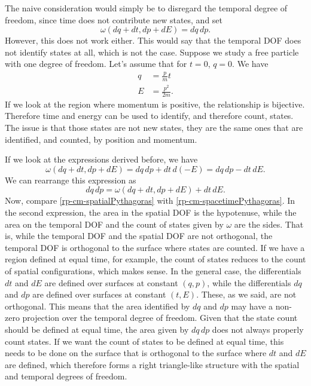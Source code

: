 The naive consideration would simply be to disregard the temporal degree of freedom, since time does not contribute new states, and set
\begin{equation}
	\omega(dq + dt, dp + dE) = dq \, dp.
\end{equation}
However, this does not work either. This would say that the temporal DOF does not identify states at all, which is not the case. Suppose we study a free particle with one degree of freedom. Let's assume that for $t=0$, $q=0$. We have
\begin{equation}
	\begin{aligned}
	q &= \frac{p}{m} t \\
	E &= \frac{p^2}{2m}.
	\end{aligned}
\end{equation}
If we look at the region where momentum is positive, the relationship is bijective. Therefore time and energy can be used to identify, and therefore count, states. The issue is that those states are not new states, they are the same ones that are identified, and counted, by position and momentum.

If we look at the expressions derived before, we have
\begin{equation}
	\omega(dq + dt, dp + dE) = dq \, dp + dt \, d(-E) = dq \, dp - dt \, dE.
\end{equation}
We can rearrange this expression as
\begin{equation}\label{rp-cm-spacetimePythagoras}
	dq \, dp = \omega(dq + dt, dp + dE) + dt \, dE.
\end{equation}
Now, compare \ref{rp-cm-spatialPythagoras} with \ref{rp-cm-spacetimePythagoras}. In the second expression, the area in the spatial DOF is the hypotenuse, while the area on the temporal DOF and the count of states given by $\omega$ are the sides. That is, while the temporal DOF and the spatial DOF are not orthogonal, the temporal DOF is orthogonal to the surface where states are counted. If we have a region defined at equal time, for example, the count of states reduces to the count of spatial configurations, which makes sense. In the general case, the differentials $dt$ and $dE$ are defined over surfaces at constant $(q, p)$, while the differentials $dq$ and $dp$ are defined over surfaces at constant $(t,E)$. These, as we said, are not orthogonal. This means that the area identified by $dq$ and $dp$ may have a non-zero projection over the temporal degree of freedom. Given that the state count should be defined at equal time, the area given by $dq \, dp$ does not always properly count states. If we want the count of states to be defined at equal time, this needs to be done on the surface that is orthogonal to the surface where $dt$ and $dE$ are defined, which therefore forms a right triangle-like structure with the spatial and temporal degrees of freedom.

